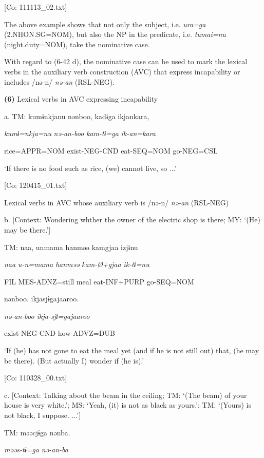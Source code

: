     [Co: 111113\_02.txt]

The above example shows that not only the subject, i.e. \textit{ura=ga} (2.NHON.SG=NOM), but also the NP in the predicate, i.e. \textit{tumai=nu} (night.duty=NOM), take the nominative case.

  With regard to (6-42 d), the nominative case can be used to mark the lexical verbs in the auxiliary verb construction (AVC) that express incapability or includes /nə-n/ \textit{nə-an} (RSL-NEG).

\textbf{(6)}  Lexical verbs in AVC expressing incapability

  a.  TM:  kumɨnkjanu  nənboo,  kadɨga  ikjankara,

      \textit{kumɨ=nkja=nu}  \textit{nə-an-boo}  \textit{kam-tɨ=ga}  \textit{ik-an=kara}

      rice=APPR=NOM  exist-NEG-CND  eat-SEQ=NOM  go-NEG=CSL

      ‘If there is no food such as rice, (we) cannot live, so ...’

      [Co: 120415\_01.txt]

  Lexical verbs in AVC whose auxiliary verb is /nə-n/ \textit{nə-an} (RSL-NEG)

  b.  [Context: Wondering whther the owner of the electric shop is there; MY: ‘(He) may be there.’]

    TM:  naa,  unmama  hanməə  kamgjaa  izjɨnu

      \textit{naa}  \textit{u-n=mama}  \textit{hanməə}  \textit{kam-Ø+gjaa}  \textit{ik-tɨ=nu}

      FIL  MES-ADNZ=still  meal  eat-INF+PURP  go-SEQ=NOM

      nənboo.  ikjasjɨgajaaroo.

      \textit{nə-an{}-boo  ikja-sjɨ=gajaaroo}

      exist-NEG-CND  how-ADVZ=DUB

      ‘If (he) has not gone to eat the meal yet (and if he is not still out) that, (he may be there). (But actually I) wonder if (he is).’

      [Co: 110328\_00.txt]

  c.  [Context: Talking about the beam in the ceiling; TM: ‘(The beam) of your house is very white.’; MS: ‘Yeah, (it) is not as black as yours.’; TM: ‘(Yours) is not black, I suppose. ...’]

    TM:  məəcjɨga  nənba.

      \textit{məəs-tɨ=ga}  \textit{nə-an{}-ba}

